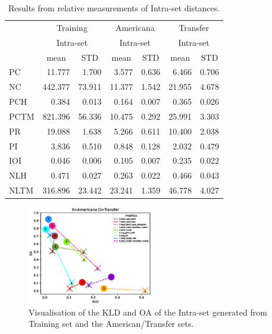 \documentclass{IEEEtran}
\begin{document}
\begin{table}
    \begin{center}
    \caption{
        Results from relative measurements of Intra-set distances.
        \label{tab:q_results}
    }
    \begin{tabular}{l|rr|rr|rr}
        \multirow{3}{*}{} & \multicolumn{2}{c|}{Training}
            & \multicolumn{2}{c|}{Americana} & \multicolumn{2}{c}{Transfer} \\
        \cline{2-7} & \multicolumn{2}{c|}{Intra-set} & \multicolumn{2}{c|}{Intra-set}
            & \multicolumn{2}{c}{Intra-set} \\
        \cline{2-7} & \multicolumn{1}{c|}{mean} & \multicolumn{1}{c|}{STD}
            & \multicolumn{1}{c|}{mean} & \multicolumn{1}{c|}{STD} 
            & \multicolumn{1}{c|}{mean} & \multicolumn{1}{c}{STD} \\ \hline
        PC & 11.777 & 1.700 & 3.577 & 0.636 & 6.466 & 0.706 \\
        NC & 442.377 & 73.911 & 11.377 & 1.542 & 21.955 & 4.678 \\
        PCH & 0.384 & 0.013 & 0.164 & 0.007 & 0.365 & 0.026 \\
        PCTM & 821.396 & 56.336 & 10.475 & 0.292 & 25.991 & 3.303 \\
        PR & 19.088 & 1.638 & 5.266 & 0.611 & 10.400 & 2.038 \\
        PI & 3.836 & 0.510 & 0.848 & 0.128 & 2.032 & 0.479 \\
        IOI & 0.046 & 0.006 & 0.105 & 0.007 & 0.235 & 0.022 \\
        NLH & 0.471 & 0.027 & 0.263 & 0.022 & 0.466 & 0.043 \\
        NLTM & 316.896 & 23.442 & 23.241 & 1.359 & 46.778 & 4.027
    \end{tabular}
    \end{center}
\end{table}

\begin{figure}
    \centering
    \includegraphics[width=0.485\textwidth]{gen_intra_gen_training_inter}
    \caption{
        Visualisation of the KLD and OA of the Intra-set generated from
        Training set and the American/Transfer sets.
        \label{fig:gen_intra_gen_training_inter}
    }
\end{figure}
\end{document}
